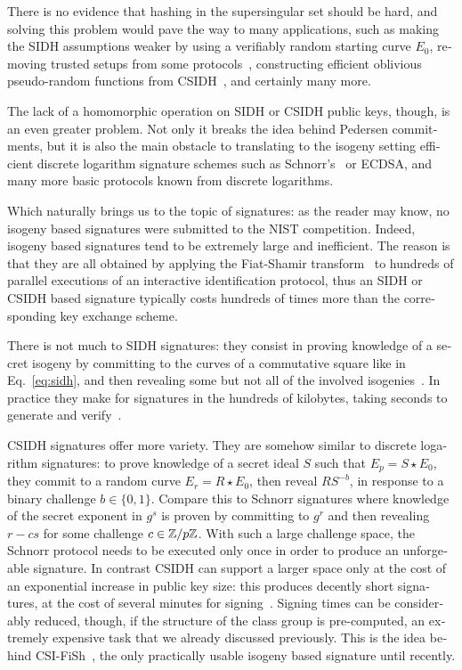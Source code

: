 \begin{otherlanguage}{english}
There is no evidence that hashing in the supersingular set should be
hard, and solving this problem would pave the way to many
applications, such as making the SIDH assumptions weaker by using a
verifiably random starting curve $E_0$, removing trusted setups from
some protocols~\cite{AC:DMPS19,EPRINT:BurDeF20}, constructing
efficient oblivious pseudo-random functions from
CSIDH~\cite{jarecki2016highly}, and certainly many more.

The lack of a homomorphic operation on SIDH or CSIDH public keys,
though, is an even greater problem. Not only it breaks the idea behind
Pedersen commitments, but it is also the main obstacle to translating
to the isogeny setting efficient discrete logarithm signature schemes
such as Schnorr's~\cite{C:Schnorr89} or ECDSA, and many more basic
protocols known from discrete logarithms.

Which naturally brings us to the topic of signatures: as the reader
may know, no isogeny based signatures were submitted to the NIST
competition. Indeed, isogeny based signatures tend to be extremely
large and inefficient. The reason is that they are all obtained by
applying the Fiat-Shamir transform~\cite{C:FiaSha86} to hundreds of
parallel executions of an interactive identification protocol, thus an
SIDH or CSIDH based signature typically costs hundreds of times more
than the corresponding key exchange scheme.

There is not much to SIDH signatures: they consist in proving
knowledge of a secret isogeny by committing to the curves of a
commutative square like in Eq.~\eqref{eq:sidh}, and then revealing
some but not all of the involved isogenies~\cite{defeo+jao+plut12}.
In practice they make for signatures in the hundreds of kilobytes,
taking seconds to generate and verify~\cite{FC:YAJJS17}.

CSIDH signatures offer more variety. They are somehow similar to
discrete logarithm signatures: to prove knowledge of a secret ideal
$S$ such that $E_p=S\star E_0$, they commit to a random curve
$E_r=R\star E_0$, then reveal $RS^{-b}$, in response to a binary
challenge $b\in\{0,1\}$. Compare this to Schnorr signatures where
knowledge of the secret exponent in $g^s$ is proven by committing to
$g^r$ and then revealing $r-cs$ for some challenge $c\in\mathbb{Z}/p\mathbb{Z}$. With
such a large challenge space, the Schnorr protocol needs to be
executed only once in order to produce an unforgeable signature. In
contrast CSIDH can support a larger space only at the cost of an
exponential increase in public key size: this produces decently short
signatures, at the cost of several minutes for
signing~\cite{EC:DeFGal19}. Signing times can be considerably reduced,
though, if the structure of the class group is pre-computed, an
extremely expensive task that we already discussed previously. This is
the idea behind CSI-FiSh~\cite{AC:BeuKleVer19}, the only
practically usable isogeny based signature until recently.


\end{otherlanguage}

